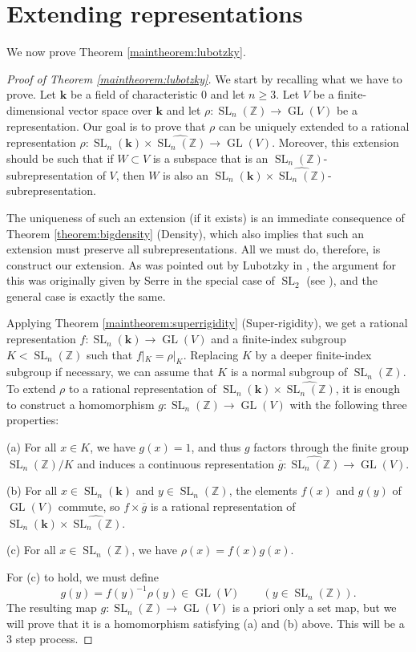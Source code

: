 \documentclass[11pt]{article}
\numberwithin{equation}{section}
\theoremstyle{plain}
\theoremstyle{definition}
\theoremstyle{remark}
\DeclareMathOperator{\GL}{GL}
\DeclareMathOperator{\SL}{SL}
\newcommand\Z{\ensuremath{\mathbb{Z}}}
\newcommand\og{\ensuremath{\overline{g}}}
\newcommand\bk{\ensuremath{\mathbf{k}}}
\newcommand\tSLn{\ensuremath{\widehat{\SL_n(\Z)}}}
\begin{document}
\section{Extending representations}
\label{section:lubotzky}

We now prove Theorem \ref{maintheorem:lubotzky}.

\begin{proof}[Proof of Theorem \ref{maintheorem:lubotzky}]
We start by recalling what we have to prove.  Let $\bk$ be a field of characteristic $0$ and 
let $n \geq 3$.  Let $V$ be a finite-dimensional vector space over $\bk$ and let 
$\rho\colon \SL_n(\Z) \rightarrow \GL(V)$ be a representation.  Our goal is to prove that 
$\rho$ can be uniquely extended to a rational representation
$\rho\colon \SL_n(\bk) \times \tSLn \rightarrow \GL(V)$.  Moreover, this extension should be such that
if $W \subset V$ is a subspace that is an $\SL_n(\Z)$-subrepresentation of $V$, then $W$ is also an
$\SL_n(\bk) \times \tSLn$-subrepresentation.

The uniqueness of such an extension (if it exists) is an immediate consequence of
Theorem \ref{theorem:bigdensity} (Density), which also implies that such an extension
must preserve all subrepresentations.  All we must do, therefore, is construct
our extension.  As was pointed out by Lubotzky in \cite[p. 680]{LubotzkyThesis}, the argument
for this was originally given by Serre in the special case of $\SL_2$ (see \cite[p. 502]{SerreCongruence}), and
the general case is exactly the same.

Applying Theorem \ref{maintheorem:superrigidity} (Super-rigidity), we get a rational
representation $f\colon \SL_n(\bk) \rightarrow \GL(V)$ and a finite-index subgroup
$K < \SL_n(\Z)$ such that $f|_K = \rho|_K$.  Replacing $K$ by a deeper finite-index
subgroup if necessary, we can assume that $K$ is a normal subgroup of $\SL_n(\Z)$.
To extend $\rho$ to a rational representation of $\SL_n(\bk) \times \tSLn$, it is
enough to construct a homomorphism $g\colon \SL_n(\Z) \rightarrow \GL(V)$
with the following three properties:
\begin{compactitem}
\item[(a)] For all $x \in K$, we have $g(x) = 1$, and thus $g$ factors through the finite group
$\SL_n(\Z)/K$ and induces a continuous representation
$\og\colon \tSLn \rightarrow \GL(V)$.
\item[(b)] For all $x \in \SL_n(\bk)$ and $y \in \SL_n(\Z)$, the elements $f(x)$ and $g(y)$ of $\GL(V)$ commute, so 
$f \times \og$ is a rational representation of $\SL_n(\bk) \times \tSLn$.
\item[(c)] For all $x \in \SL_n(\Z)$, we have $\rho(x) = f(x) g(x)$.
\end{compactitem}
For (c) to hold, we must define
\[g(y) = f(y)^{-1} \rho(y) \in \GL(V) \quad \quad (y \in \SL_n(\Z)).\]
The resulting map $g\colon \SL_n(\Z) \rightarrow \GL(V)$ is a priori only a set map, but we
will prove that it is a homomorphism satisfying (a) and (b) above.  This will be a 3 step process.


\end{proof}
\end{document}
